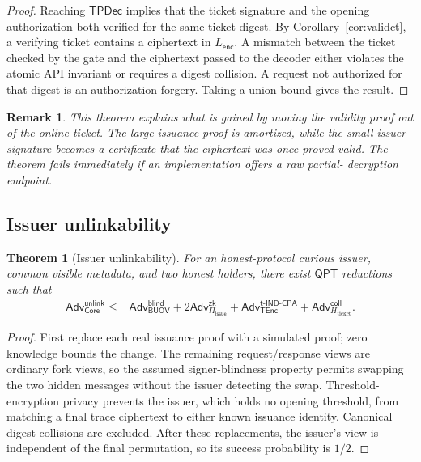 \documentclass[11pt]{article}
\newtheorem{theorem}[definition]{Theorem}
\newtheorem{remark}[definition]{Remark}
\newcommand{\Core}{\mathsf{Core}}
\newcommand{\BUOV}{\mathsf{BUOV}}
\newcommand{\Piiss}{\Pi_{\mathsf{issue}}}
\newcommand{\TEnc}{\mathsf{TEnc}}
\newcommand{\TPDec}{\mathsf{TPDec}}
\newcommand{\Adv}{\mathsf{Adv}}
\newcommand{\QPT}{\mathsf{QPT}}
\begin{document}
\begin{proof}
Reaching $\TPDec$ implies that the ticket signature and the opening
authorization both verified for the same ticket digest.  By
Corollary~\ref{cor:validct}, a verifying ticket contains a ciphertext in
$L_{\mathsf{enc}}$.  A mismatch between the ticket checked by the gate and the
ciphertext passed to the decoder either violates the atomic API invariant or
requires a digest collision.  A request not authorized for that digest is an
authorization forgery.  Taking a union bound gives the result.
\end{proof}

\begin{remark}
This theorem explains what is gained by moving the validity proof out of the
online ticket.  The large issuance proof is amortized, while the small issuer
signature becomes a certificate that the ciphertext was once proved valid.
The theorem fails immediately if an implementation offers a raw partial-
decryption endpoint.
\end{remark}

\subsection{Issuer unlinkability}

\begin{theorem}[Issuer unlinkability]\label{thm:unlink}
For an honest-protocol curious issuer, common visible metadata, and two honest
holders, there exist $\QPT$ reductions such that
\begin{align*}
 \Adv^{\mathsf{unlink}}_{\Core}
 \leq{}& \Adv^{\mathsf{blind}}_{\BUOV}
 +2\Adv^{\mathsf{zk}}_{\Piiss}
 +\Adv^{\mathsf{t\text{-}IND\text{-}CPA}}_{\TEnc}
 +\Adv^{\mathsf{coll}}_{H_{\mathrm{ticket}}}.
\end{align*}
\end{theorem}

\begin{proof}
First replace each real issuance proof with a simulated proof; zero knowledge
bounds the change.  The remaining request/response views are ordinary fork
views, so the assumed signer-blindness property permits swapping the two hidden messages
without the issuer detecting the swap.  Threshold-encryption privacy prevents the issuer, which
holds no opening threshold, from matching a final trace ciphertext to either
known issuance identity.  Canonical digest collisions are excluded.  After
these replacements, the issuer's view is independent of the final permutation,
so its success
probability is $1/2$.
\end{proof}
\end{document}
